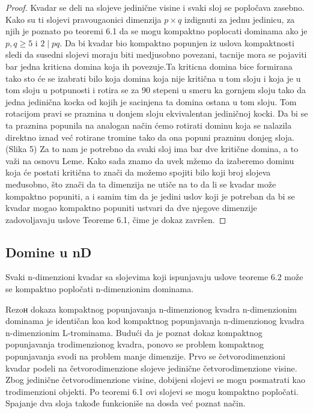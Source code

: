 \begin{proof}
    Kvadar se deli na slojeve jedinične visine i svaki sloj se popločava zasebno. Kako su ti slojevi pravougaonici dimenzija $p\times q$ izdignuti za jednu jedinicu, za njih je poznato po teoremi 6.1 da se mogu kompaktno poplocati dominama ako je $p,q \geq 5$ i $2\mid pq$.
    Da bi kvadar bio kompaktno popunjen iz uslova kompaktnosti sledi da susedni slojevi moraju biti medjusobno povezani, tacnije mora se pojaviti bar jedna kriticna domina koja ih povezuje.Ta kriticna domina bice formirana tako sto će se izabrati bilo koja domina koja nije kritična u tom sloju i koja je u tom sloju u potpunosti i rotira se za 90 stepeni u smeru ka gornjem sloju tako da jedna  jedinična kocka od kojih je sacinjena ta domina ostana u tom sloju. Tom rotacijom pravi se praznina u donjem sloju ekvivalentan jediničnoj kocki. Da bi se ta praznina popunila na analogan način ćemo rotirati dominu koja se nalazila direktno iznad već rotirane tromine tako da ona popuni prazninu donjeg sloja.(Slika 5)
    Za to nam je potrebno da svaki sloj ima bar dve kritične domina, a to važi na osnovu Leme.
    Kako sada znamo da uvek mžemo da izaberemo dominu koja će postati kritična to znači da možemo spojiti bilo koji broj slojeva međusobno, što znači da ta dimenzija ne utiče na to da li se kvadar može kompaktno popuniti, a i samim tim da je jedini uslov koji je potreban da bi se kvadar mogao kompaktno popuniti ustvari da dve njegove dimenzije zadovoljavaju uslove Teoreme 6.1, čime je dokaz završen. 
\end{proof}

\subsection{Domine u nD}

\begin{Theorem}
    Svaki n-dimenzioni kvadar sa slojevima koji ispunjavaju uslove teoreme 6.2 može se kompaktno popločati n-dimenzionim dominama.
\end{Theorem}

Rezoн dokaza kompaktnog popunjavanja n-dimenzionog kvadra n-dimenzionim dominama je 
identičan koa kod kompaktnog popunjavanja n-dimenzionog kvadra n-dimenzionim L-trominama. Budući da je poznat dokaz kompaktnog popunjavanja trodimenzionog kvadra, ponovo se problem kompaktnog popunjavanja svodi na problem manje dimenzije. Prvo se četvorodimenzioni kvadar podeli na četvorodimenzione slojeve jedinične četvorodimenzione visine. Zbog jedinične četvorodimenzione visine, dobijeni slojevi se mogu posmatrati kao trodimenzioni objekti. Po teoremi 6.1 ovi slojevi se mogu kompaktno popločati. Spajanje dva sloja takođe funkcioniše na dosda već poznat način. 


